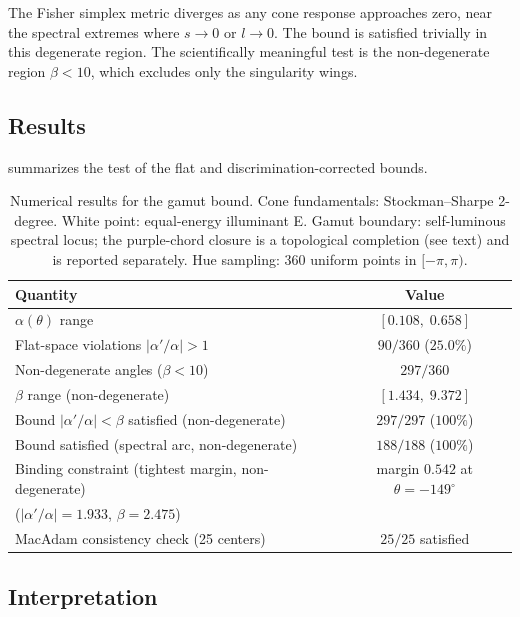 \documentclass[preprint,12pt,authoryear]{elsarticle}
\theoremstyle{plain}
\theoremstyle{definition}
\theoremstyle{remark}
\begin{document}
The Fisher simplex metric diverges as any cone response approaches zero, near the spectral extremes where $s\to0$ or $l\to0$. The bound is satisfied trivially in this degenerate region. The scientifically meaningful test is the non-degenerate region $\beta<10$, which excludes only the singularity wings.

\subsection{Results}
\label{app:subsec:results}

\noindent {} summarizes the test of the flat and discrimination-corrected bounds.

\begin{table}[!htbp]
\centering
\caption{Numerical results for the gamut bound. Cone fundamentals: Stockman--Sharpe 2-degree. White point: equal-energy illuminant E. Gamut boundary: self-luminous spectral locus; the purple-chord closure is a topological completion (see text) and is reported separately. Hue sampling: 360 uniform points in $[-\pi,\pi)$.}
\label{tab:gamut-bound-results}
\begin{tabular}{lc}
\toprule
\textbf{Quantity} & \textbf{Value} \\
\midrule
$\alpha(\theta)$ range & $[0.108,\; 0.658]$ \\
Flat-space violations $|\alpha'/\alpha|>1$ & $90/360$ ($25.0\%$) \\
\midrule
Non-degenerate angles ($\beta<10$) & $297/360$ \\
$\beta$ range (non-degenerate) & $[1.434,\; 9.372]$ \\
Bound $|\alpha'/\alpha|<\beta$ satisfied (non-degenerate) & $297/297$ ($100\%$) \\
Bound satisfied (spectral arc, non-degenerate) & $188/188$ ($100\%$) \\
\midrule
Binding constraint (tightest margin, non-degenerate) & margin $0.542$ at $\theta=-149^\circ$ \\
\quad ($|\alpha'/\alpha|=1.933$, $\beta=2.475$) & \\
\midrule
MacAdam consistency check (25 centers) & $25/25$ satisfied \\
\bottomrule
\end{tabular}
\end{table}

\subsection{Interpretation}
\label{app:subsec:interpretation}
\end{document}
